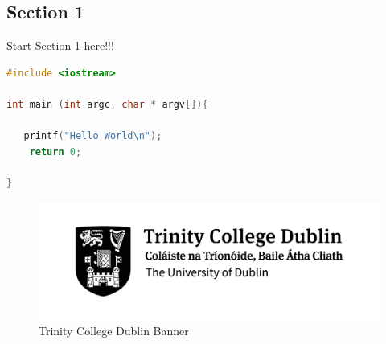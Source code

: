 \textcolor{tcd_blue}{\section{Section 1}}

\vspace{1cm}

Start Section 1 here!!!

\vspace{1cm}

\begin{lstlisting}[language=c, caption= this is a code block]
#include <iostream>

int main (int argc, char * argv[]){

   printf("Hello World\n");
    return 0;

}
\end{lstlisting}

\vspace{1cm}



\begin{figure}[h!]
    \centering
    \includegraphics[width=0.75\linewidth]{images/Trinity_Black_Logo.jpg}
    \caption{Trinity College Dublin Banner}
    \label{fig:enter-label}
\end{figure}